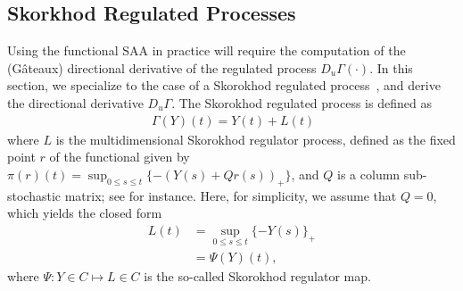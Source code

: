 \documentclass[11pt,leqno]{amsart}
\begin{document}
\subsection{Skorkhod Regulated Processes}
Using the functional SAA in practice will require the computation of the (G\^{a}teaux) directional derivative of the regulated process $D_u \Gamma (\cdot)$. In this section, we specialize to the case of a Skorokhod regulated process~\cite[Chapter 7]{chen2001fundamentals},\cite[Ch. 14]{Whitt_2002_supplement} and derive the directional derivative $D_u \Gamma$. The Skorokhod regulated process is defined as 
\begin{align}~\label{eq:rbm}
	\Gamma\left(Y\right) (t) = Y(t) + L(t)
\end{align}
where $L$ is the multidimensional Skorokhod regulator process, defined as the fixed point $r$ of the functional given by $\pi(r)(t) = \sup_{0\leq s \leq t}\{-(Y(s) + Q r(s))_+\}$, and $Q$ is a column sub-stochastic matrix; see \citep[Sec. 14.2]{Whitt_2002} for instance. Here, for simplicity, we assume that $Q = 0$, which yields the closed form
\begin{align*}
   L(t) &= \sup_{0 \leq s\leq t}\{-Y(s)\}_+\\
   &= \Psi(Y)(t),
\end{align*}
where $\Psi:Y\in C\mapsto L\in C$ is the so-called Skorokhod regulator map.
\end{document}
